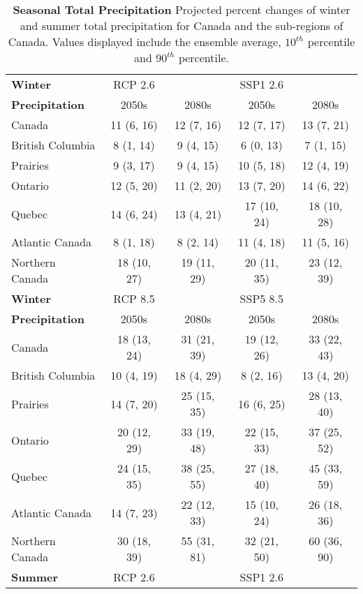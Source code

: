\documentclass[]{scrartcl}
\begin{document}
\begin{appendices}
\begin{table}[t]
	\caption{\textbf{Seasonal Total Precipitation} Projected percent changes of winter and summer total precipitation for Canada and the sub-regions of Canada. Values displayed include the ensemble average, $10^{th}$ percentile and $90^{th}$ percentile.}\label{table:bc_seas_pr}
	\begin{center}
		\begin{tabularx}{\linewidth}{|L|cc|cc|} 
			\hline
			\textbf{Winter} & RCP 2.6 & & SSP1 2.6 &   \\
			\textbf{Precipitation}                & 2050s & 2080s & 2050s &2080s \\
			\hline
			Canada & 11 (6, 16) & 12 (7, 16) & 12 (7, 17) & 13 (7, 21) \\ 
			British Columbia & 8 (1, 14) & 9 (4, 15) & 6 (0, 13) & 7 (1, 15) \\ 
			Prairies & 9 (3, 17) & 9 (4, 15) & 10 (5, 18) & 12 (4, 19) \\ 
			Ontario & 12 (5, 20) & 11 (2, 20) & 13 (7, 20) & 14 (6, 22) \\ 
			Quebec & 14 (6, 24) & 13 (4, 21) & 17 (10, 24) & 18 (10, 28) \\ 
			Atlantic Canada & 8 (1, 18) & 8 (2, 14) & 11 (4, 18) & 11 (5, 16) \\ 
			Northern Canada & 18 (10, 27) & 19 (11, 29) & 20 (11, 35) & 23 (12, 39) \\ 
			\hline
			\textbf{Winter} & RCP 8.5 & & SSP5 8.5 &   \\
			\textbf{Precipitation}			& 2050s & 2080s & 2050s &2080s \\
			\hline
			Canada & 18 (13, 24) & 31 (21, 39) & 19 (12, 26) & 33 (22, 43) \\ 
			British Columbia & 10 (4, 19) & 18 (4, 29) & 8 (2, 16) & 13 (4, 20) \\ 
			Prairies & 14 (7, 20) & 25 (15, 35) & 16 (6, 25) & 28 (13, 40) \\ 
			Ontario & 20 (12, 29) & 33 (19, 48) & 22 (15, 33) & 37 (25, 52) \\ 
			Quebec & 24 (15, 35) & 38 (25, 55) & 27 (18, 40) & 45 (33, 59) \\ 
			Atlantic Canada & 14 (7, 23) & 22 (12, 33) & 15 (10, 24) & 26 (18, 36) \\ 
			Northern Canada & 30 (18, 39) & 55 (31, 81) & 32 (21, 50) & 60 (36, 90) \\ 			
			\hline
			\hline
			\textbf{Summer} & RCP 2.6 & & SSP1 2.6 &   \\

\end{tabularx}
\end{center}
\end{table}
\end{appendices}
\end{document}
